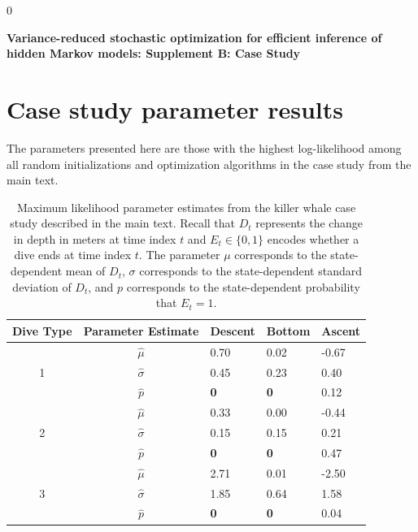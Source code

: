 \documentclass[12pt]{article}
\newcommand{\blind}{0}
\begin{document}
\blind
{
  \bigskip
  \bigskip
  \bigskip
  \begin{center}
    {\LARGE\bf Variance-reduced stochastic optimization for efficient inference of hidden Markov models: Supplement B: Case Study}
  \end{center}
  \medskip
} \fi


\section{Case study parameter results}

The parameters presented here are those with the highest log-likelihood among all random initializations and optimization algorithms in the case study from the main text.

\begin{table}[H]
\centering
\begin{tabular}{c|c|lll}
\multicolumn{1}{l|}{Dive Type} & Parameter Estimate & Descent & Bottom & Ascent \\ \hline
\multirow{3}{*}{1}            & $\hat \mu$     & 0.70    & 0.02   & -0.67  \\
                              & $\hat \sigma$  & 0.45    & 0.23   & 0.40   \\
                              & $\hat p$       & \bf{0}  & \bf{0} & 0.12   \\ \hline 
\multirow{3}{*}{2}            & $\hat \mu$     & 0.33    & 0.00   & -0.44  \\
                              & $\hat \sigma$  & 0.15    & 0.15   & 0.21   \\
                              & $\hat p$       & \bf{0}  & \bf{0} & 0.47   \\ \hline
\multirow{3}{*}{3}            & $\hat \mu$     & 2.71    & 0.01   & -2.50  \\
                              & $\hat \sigma$  & 1.85    & 0.64   & 1.58   \\
                              & $\hat p$       & \bf{0}  & \bf{0} & 0.04  
\end{tabular}
\caption{Maximum likelihood parameter estimates from the killer whale case study described in the main text. Recall that $D_t$ represents the change in depth in meters at time index $t$ and $E_t \in \{0,1\}$ encodes whether a dive ends at time index $t$. The parameter $\mu$ corresponds to the state-dependent mean of $D_t$, $\sigma$ corresponds to the state-dependent standard deviation of $D_t$, and $p$ corresponds to the state-dependent probability that $E_t=1$.}
\end{table}
\end{document}
